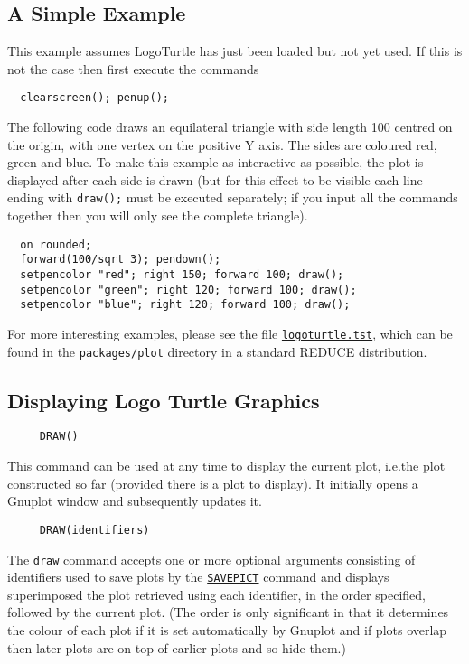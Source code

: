 \subsection{A Simple Example}

This example assumes LogoTurtle has just been loaded but not yet used.
If this is not the case then first execute the commands
\begin{verbatim}
  clearscreen(); penup();
\end{verbatim}

The following code draws an equilateral triangle with side length 100
centred on the origin, with one vertex on the positive Y axis.  The
sides are coloured red, green and blue.  To make this example as
interactive as possible, the plot is displayed after each side is
drawn (but for this effect to be visible each line ending with
\texttt{draw();} must be executed separately; if you input all the
commands together then you will only see the complete triangle).
\begin{verbatim}
  on rounded;
  forward(100/sqrt 3); pendown();
  setpencolor "red"; right 150; forward 100; draw();
  setpencolor "green"; right 120; forward 100; draw();
  setpencolor "blue"; right 120; forward 100; draw();
\end{verbatim}

For more interesting examples, please see the file
\href{https://sourceforge.net/p/reduce-algebra/code/HEAD/tree/trunk/packages/plot/logoturtle.tst}{\texttt{logoturtle.tst}},
which can be found in the \texttt{packages/plot} directory in a
standard REDUCE distribution.


\subsection{Displaying Logo Turtle Graphics}

\begin{verbatim}
     DRAW()
\end{verbatim}
\label{logoturtle:draw}
This command can be used at any time to display the current plot,
i.e.\@ the plot constructed so far (provided there is a plot to
display).  It initially opens a Gnuplot window and subsequently
updates it.

\begin{verbatim}
     DRAW(identifiers)
\end{verbatim}
The \texttt{draw} command accepts one or more optional arguments
consisting of identifiers used to save plots by the
\hyperref[logoturtle:savepict]{\texttt{SAVEPICT}} command and displays
superimposed the plot retrieved using each identifier, in the order
specified, followed by the current plot.  (The order is only
significant in that it determines the colour of each plot if it is set
automatically by Gnuplot and if plots overlap then later plots are on
top of earlier plots and so hide them.)


